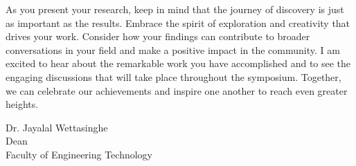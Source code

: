 As you present your research, keep in mind that the journey of discovery is just as important as the results. Embrace the spirit of exploration and creativity that drives your work. Consider how your findings can contribute to broader conversations in your field and make a positive impact in the community. I am excited to hear about the remarkable work you have accomplished and to see the engaging discussions that will take place throughout the symposium. Together, we can celebrate our achievements and inspire one another to reach even greater heights.

	\vspace{1cm}
	\noindent
	Dr. Jayalal Wettasinghe\\
Dean\\
Faculty of Engineering Technology
	
	\newpage